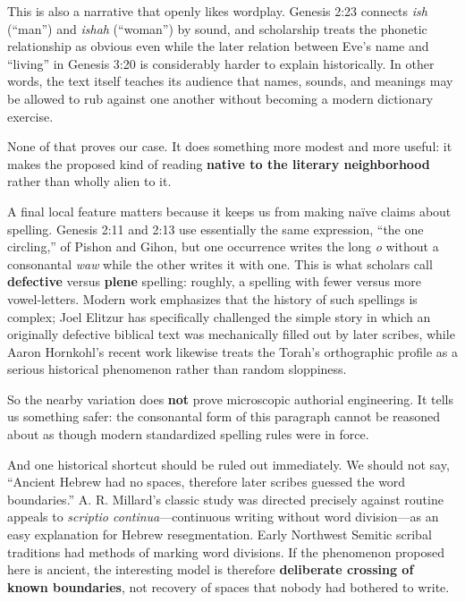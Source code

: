 This is also a narrative that openly likes wordplay. Genesis 2:23 connects \textit{ish} (``man'') and \textit{ishah} (``woman'') by sound, and scholarship treats the phonetic relationship as obvious even while the later relation between Eve's name and ``living'' in Genesis 3:20 is considerably harder to explain historically. In other words, the text itself teaches its audience that names, sounds, and meanings may be allowed to rub against one another without becoming a modern dictionary exercise.\cite{Napora2022}

None of that proves our case. It does something more modest and more useful: it makes the proposed kind of reading \textbf{native to the literary neighborhood} rather than wholly alien to it.

A final local feature matters because it keeps us from making naïve claims about spelling. Genesis 2:11 and 2:13 use essentially the same expression, ``the one circling,'' of Pishon and Gihon, but one occurrence writes the long \textit{o} without a consonantal \textit{waw} while the other writes it with one. This is what scholars call \textbf{defective} versus \textbf{plene} spelling: roughly, a spelling with fewer versus more vowel-letters. Modern work emphasizes that the history of such spellings is complex; Joel Elitzur has specifically challenged the simple story in which an originally defective biblical text was mechanically filled out by later scribes, while Aaron Hornkohl's recent work likewise treats the Torah's orthographic profile as a serious historical phenomenon rather than random sloppiness.\cite{Elitzur2023,Hornkohl2024}

So the nearby variation does \textbf{not} prove microscopic authorial engineering. It tells us something safer: the consonantal form of this paragraph cannot be reasoned about as though modern standardized spelling rules were in force.

And one historical shortcut should be ruled out immediately. We should not say, ``Ancient Hebrew had no spaces, therefore later scribes guessed the word boundaries.'' A. R. Millard's classic study was directed precisely against routine appeals to \textit{scriptio continua}---continuous writing without word division---as an easy explanation for Hebrew resegmentation. Early Northwest Semitic scribal traditions had methods of marking word divisions. If the phenomenon proposed here is ancient, the interesting model is therefore \textbf{deliberate crossing of known boundaries}, not recovery of spaces that nobody had bothered to write.\cite{Millard1970}

